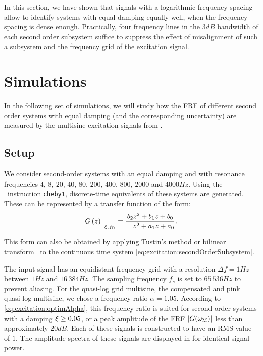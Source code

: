   In this section, we have shown that signals with a logarithmic frequency spacing allow to identify systems with equal damping equally well, when the frequency spacing is dense enough.
  Practically, four frequency lines in the $3\unit{dB}$ bandwidth of each second order subsystem suffice to suppress the effect of misalignment of such a subsystem and the frequency grid of the excitation signal.
  
\section{Simulations} \label{sec:excitation:simulation}
In the following set of simulations, we will study how the \gls{FRF} of different second order systems with equal damping (and the corresponding uncertainty) are measured by the multisine excitation signals from .
  \subsection{Setup}
  We consider second-order systems with an equal damping and with resonance frequencies $4$, $8$, $20$, $40$, $80$, $200$, $400$, $800$, $2000$ and $4000 \unit{Hz}$.
  Using the \matlab\ instruction \texttt{cheby1}, discrete-time equivalents of these systems are generated.
  These can be represented by a transfer function of the form:
  \begin{equation}
    G \left( z \right)\Big|_{\damping, \fR} =
       \frac{         b_2  z^{2} + b_1 z + b_0}%
            {\phantom{a_2} z^{2} + a_1 z + a_0}
  \text{.}
  \label{eq:excitation:secondOrderSystemDTidentifiable}
  \end{equation}

  This form can also be obtained by applying Tustin's method or bilinear transform~\citep{Oppenheim1983} to the continuous time system \eqref{eq:excitation:secondOrderSubsystem}.

  The input signal has an equidistant frequency grid with a resolution $\Delta f = 1\unit{Hz}$ between $1 \unit{Hz}$ and $16\,384\unit{Hz}$.
  The sampling frequency $f_s$ is set to $65\,536\unit{Hz}$ to prevent aliasing.
  For the quasi-log grid multisine, the compensated and pink quasi-log multisine, we chose a frequency ratio $\alpha = 1.05$.
  According to \eqref{eq:excitation:optimAlpha}, this frequency ratio is suited for second-order systems with a damping $\xi_{} \geq 0.05$, or a peak amplitude of the \gls{FRF} $\left| G(\omega_{\mathrm{M}}) \right|$ less than approximately $20\unit{dB}$.
  Each of these signals is constructed to have an \gls{RMS} value of $1$.
  The amplitude spectra of these signals are displayed in  for identical signal power.

